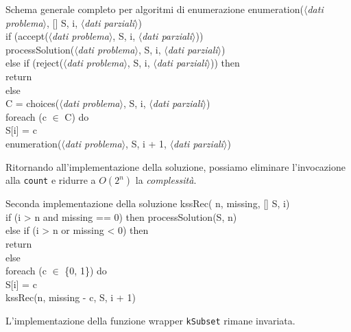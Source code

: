 \begin{code}{Schema generale completo per algoritmi di enumerazione}
\noindent\noindent enumeration($\langle$\emph{dati problema}$\rangle$, [] S,
     i, $\langle$\emph{dati parziali}$\rangle$)\\
    \indent{}
    \indent if (accept($\langle$\emph{dati problema}$\rangle$, S, i,
        $\langle$\emph{dati parziali}$\rangle$))\\
        \indf{}
        \indf processSolution($\langle$\emph{dati problema}$\rangle$, S, i,
        $\langle$\emph{dati parziali}$\rangle$)\\
    \ind{}
    \ind else if (reject($\langle$\emph{dati problema}$\rangle$, S, i,
    $\langle$\emph{dati parziali}$\rangle$)) then\\
        \indf return\\
    \ind else\\
        \indf{}
        \indf{} C = choices($\langle$\emph{dati problema}$\rangle$, S, i,
        $\langle$\emph{dati parziali}$\rangle$)\\
        \indf{}
        \indf foreach (c $\in$ C) do\\
            \indff S[i] = c\\
            \indff{}
            \indff enumeration($\langle$\emph{dati problema}$\rangle$, S, i + 1,
            $\langle$\emph{dati parziali}$\rangle$)
\end{code}

\noindent
Ritornando all'implementazione della soluzione, possiamo eliminare l'invocazione
alla \texttt{count} e ridurre a $O(2^n)$ la \emph{complessità}.

\begin{minicode}{Seconda implementazione della soluzione}
\ind kssRec( n,  missing, [] S,  i)\\
    \indf if (i > n and missing == 0) then\hfill{}
        processSolution(S, n)\\
    \indf else if (i > n or missing < 0) then\\
        return\\
    \indf else\\
        \indff foreach (c $\in$ \{0, 1\}) do\\
            S[i] = c\\
            kssRec(n, missing - c, S, i + 1)
\end{minicode}
\begin{note}
    L'implementazione della funzione wrapper \texttt{kSubset} rimane invariata.
\end{note}

